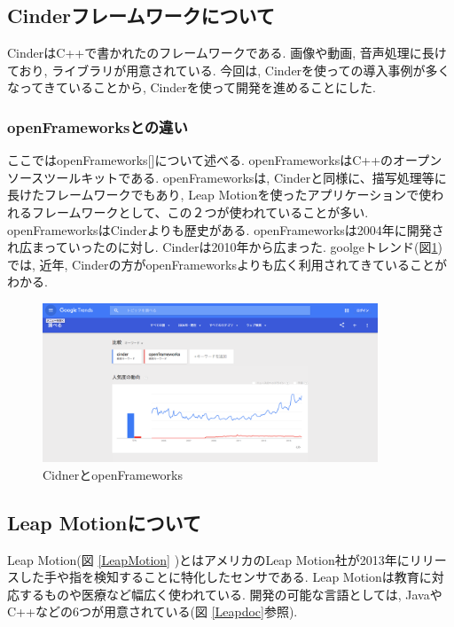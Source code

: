 \documentclass{funthesis}
\begin{document}
\subsection{Cinderフレームワークについて}
CinderはC++で書かれたのフレームワークである. 画像や動画, 音声処理に長けており, ライブラリが用意されている. 今回は, Cinderを使っての導入事例が多くなってきていることから, Cinderを使って開発を進めることにした. 



\subsubsection{openFrameworksとの違い}
ここではopenFrameworks[]について述べる. openFrameworksはC++のオープンソースツールキットである. openFrameworksは, Cinderと同様に、描写処理等に長けたフレームワークでもあり, Leap Motionを使ったアプリケーションで使われるフレームワークとして、この２つが使われていることが多い. 
openFrameworksはCinderよりも歴史がある. openFrameworksは2004年に開発され広まっていったのに対し. Cinderは2010年から広まった. goolgeトレンド(図\ref{API})では, 近年, Cinderの方がopenFrameworksよりも広く利用されてきていることがわかる. 

\begin{figure}[H]
 \begin{center}
  \includegraphics[width=100mm]{./img/api.png}
 \end{center}
 \caption{CidnerとopenFrameworks}
 \label{API}
\end{figure}


\subsection{Leap Motionについて}
Leap Motion(図 \ref{LeapMotion} )とはアメリカのLeap Motion社が2013年にリリースした手や指を検知することに特化したセンサである. Leap Motionは教育に対応するものや医療など幅広く使われている. 開発の可能な言語としては, JavaやC++などの6つが用意されている(図 \ref{Leapdoc}参照).
\end{document}
